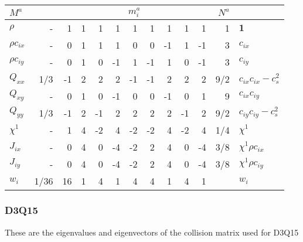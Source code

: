 \begin{table}
\begin{tabular}{|l|r|rrrrrrrrr|r|l|}
\hline\hline
$M^a$ & & \multicolumn{9}{c|}{$m_i^a$} & $N^a$  &\\
\hline
$\rho$ & - & 1 &  1 &  1 &  1 &  1 &  1 &  1 &   1 &  1 & 1 &$\mathbf{1}$ \\
\hline
$\rho c_{ix}$ & - & 0 &  1 &  1 & 1 & 0 &  0 & -1 &  1 & -1 & 3 & $c_{ix}$ \\
\hline
$\rho c_{iy}$ & - & 0 & 1 &  0 &  -1 &  1 &  -1 & 1 & 0 & -1 & 3  &$c_{iy}$ \\
\hline
$Q_{xx}$ & 1/3 & -1 &  2 &  2 & 2 & -1 & -1 & 2 & 2 & 2 & 9/2 
& $c_{ix} c_{ix} - c_s^2$ \\
\hline
$Q_{xy}$ & - & 0 &  1 & 0 & -1 & 0 & 0 & -1 & 0 & 1 & 9 & $c_{ix} c_{iy}$ \\
\hline
$Q_{yy}$ & 1/3 & -1 &  2 & -1 & 2 & 2 & 2 & 2 & -1 & 2 & 9/2
& $c_{iy} c_{iy} - c_s^2$ \\
\hline\hline
$\chi^1$ & - &  1 & 4 & -2 & 4 & -2 & -2 & 4 & -2 & 4 & 1/4 & $\chi^1$ \\
\hline
$J_{ix}$ & - & 0 &  4 & 0 & -4 & -2 & 2 & 4 & 0 & -4 & 3/8
& $\chi^1 \rho c_{ix}$\\
\hline
$J_{iy}$ & - & 0 & 4 & 0 & -4 & -2 & 2 & 4 & 0 & -4 & 3/8
& $\chi^1 \rho c_{iy}$\\
\hline\hline
$w_i$ & 1/36 & 16 & 1 & 4 & 1 & 4 & 4 & 1 & 4 & 1 & & $w_i$\\
\hline\hline
\end{tabular}
\end{table}

\subsubsection{D3Q15}

These are the eigenvalues and eigenvectors of the collision
matrix used for D3Q15


